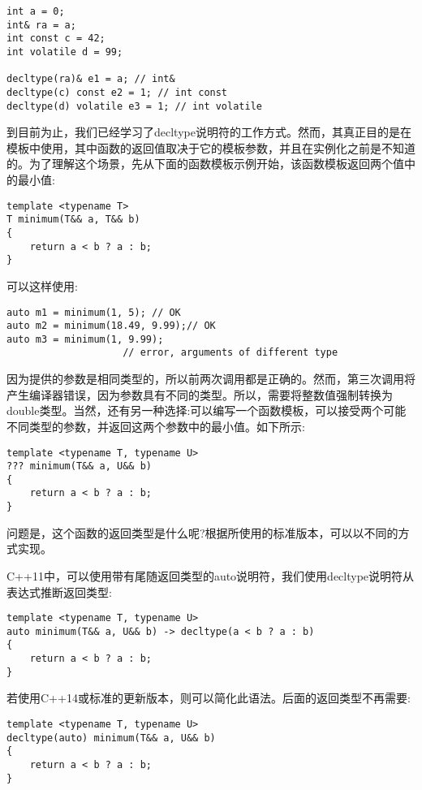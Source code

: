 \begin{lstlisting}[style=styleCXX]
int a = 0;
int& ra = a;
int const c = 42;
int volatile d = 99;

decltype(ra)& e1 = a; // int&
decltype(c) const e2 = 1; // int const
decltype(d) volatile e3 = 1; // int volatile
\end{lstlisting}

到目前为止，我们已经学习了decltype说明符的工作方式。然而，其真正目的是在模板中使用，其中函数的返回值取决于它的模板参数，并且在实例化之前是不知道的。为了理解这个场景，先从下面的函数模板示例开始，该函数模板返回两个值中的最小值:

\begin{lstlisting}[style=styleCXX]
template <typename T>
T minimum(T&& a, T&& b)
{
	return a < b ? a : b;
}
\end{lstlisting}

可以这样使用:

\begin{lstlisting}[style=styleCXX]
auto m1 = minimum(1, 5); // OK
auto m2 = minimum(18.49, 9.99);// OK
auto m3 = minimum(1, 9.99);
                    // error, arguments of different type
\end{lstlisting}

因为提供的参数是相同类型的，所以前两次调用都是正确的。然而，第三次调用将产生编译器错误，因为参数具有不同的类型。所以，需要将整数值强制转换为double类型。当然，还有另一种选择:可以编写一个函数模板，可以接受两个可能不同类型的参数，并返回这两个参数中的最小值。如下所示:

\begin{lstlisting}[style=styleCXX]
template <typename T, typename U>
??? minimum(T&& a, U&& b)
{
	return a < b ? a : b;
}
\end{lstlisting}

问题是，这个函数的返回类型是什么呢?根据所使用的标准版本，可以以不同的方式实现。

C++11中，可以使用带有尾随返回类型的auto说明符，我们使用decltype说明符从表达式推断返回类型:

\begin{lstlisting}[style=styleCXX]
template <typename T, typename U>
auto minimum(T&& a, U&& b) -> decltype(a < b ? a : b)
{
	return a < b ? a : b;
}
\end{lstlisting}

若使用C++14或标准的更新版本，则可以简化此语法。后面的返回类型不再需要:

\begin{lstlisting}[style=styleCXX]
template <typename T, typename U>
decltype(auto) minimum(T&& a, U&& b)
{
	return a < b ? a : b;
}
\end{lstlisting}

